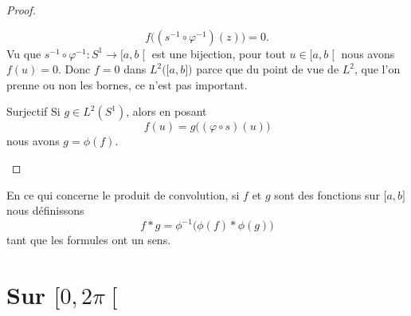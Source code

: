 \begin{proof}
\begin{subproof}
            \begin{equation}
                f\big( (s^{-1}\circ\varphi^{-1})(z) \big)=0.
            \end{equation}
            Vu que \( s^{-1}\circ\varphi^{-1}\colon S^1 \to \mathopen[ a , b \mathclose[\) est une bijection, pour tout \( u\in\mathopen[ a , b \mathclose[\) nous avons \( f(u)=0\). Donc \( f=0\) dans \( L^2\big( \mathopen[ a , b \mathclose] \big)\) parce que du point de vue de \( L^2\), que l'on prenne ou non les bornes, ce n'est pas important.
        \item[Surjectif]
            Si \( g\in L^2(S^1)\), alors en posant
            \begin{equation}
                f(u)=g\big( (\varphi\circ s)(u) \big)
            \end{equation}
            nous avons \( g=\phi(f)\).
    \end{subproof}
\end{proof}

\begin{definition}
    En ce qui concerne le produit de convolution, si \( f\) et \( g\) sont des fonctions sur \( \mathopen[ a , b \mathclose]\) nous définissons
    \begin{equation}
        f*g=\phi^{-1}\big( \phi(f)*\phi(g) \big)
    \end{equation}
    tant que les formules ont un sens.
\end{definition}

\section{Sur \( \mathopen[ 0 , 2\pi \mathclose[\)}

